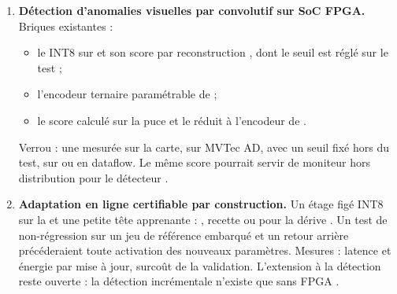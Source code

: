 \begin{enumerate}
    puissance de carte, repos déduit) et de ceux de 
    \citep{2021-xu-dac-sdc-low-power-object}, de FINN
    \citep{arxiv-1612.07119-finn-framework-fast-scalable-binarized} et d'Alqahtani et al.
    \citep{arxiv-2409.16808-comprehensive-evaluation-deep-learning-object}\pp.
  \item \textbf{Détection d'anomalies visuelles par  convolutif sur SoC FPGA.}
    Briques existantes :
    \begin{itemize}
      \item le  INT8 sur  et son score par reconstruction
        \citep{arxiv-2407.17647-energy-efficient-artefact-detection-accelerator}, dont le
        seuil est réglé sur le test ;
      \item l'encodeur ternaire paramétrable de
        \citet{2021-manjunath-energy-efficient-edgeai-autoencoder-accelerator} ;
      \item le score calculé sur la puce et le  réduit à l'encodeur de
        \citet{arxiv-2108.03986-autoencoders-fpgas-real-time-unsupervised}.
    \end{itemize}
    Verrou : une  mesurée sur la carte, sur MVTec AD, avec un seuil fixé hors du test,
    sur  ou en dataflow. Le même score pourrait servir de moniteur hors distribution
    pour le détecteur \deduit.
  \item \textbf{Adaptation en ligne certifiable par construction.} Un étage figé INT8 sur
    la  et une petite tête apprenante : 
    \citep{2021-piyasena-accelerating-continual-learning-edge-fpga}, recette 
    \citep{arxiv-2110.10486-tinyml-platform-device-continual-learning} ou  pour la
    dérive \citep{2019-tsukada-neural-network-device-learning-anomaly}. Un test de
    non-régression sur un jeu de référence embarqué et un retour arrière précéderaient
    toute activation des nouveaux paramètres. Mesures : latence et énergie par mise à jour,
    surcoût de la validation. L'extension à la détection reste ouverte : la détection
    incrémentale n'existe que sans FPGA
    \citep{arxiv-2409.01872-latent-distillation-continual-object-detection}\pp.
\end{enumerate}
